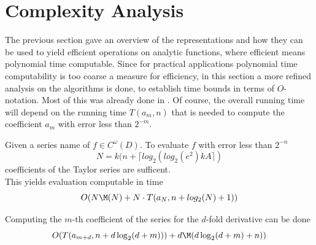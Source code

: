 	\section{Complexity Analysis}
		The previous section gave an overview of the representations and how they can be used to yield efficient 
		operations on analytic functions, where efficient means polynomial time computable.
		Since for practical applications polynomial time computability is too coarse a measure for efficiency, 
		in this section a more refined analysis on the algorithms is done, to establish time bounds in terms of $O$-notation.
		Most of this was already done in \cite{mypaper}.
		Of course, the overall running time will depend on the running time $T(a_m, n)$ that is needed to 
		compute the coefficient $a_m$ with error less than $2^{-m}$.
		\begin{theorem}
			Given a series name of $f \in C^\omega(D)$.
			To evaluate $f$ with error less than $2^{-n}$ 
			$$N = k(n+\lceil log_2(log_2 (e^2) kA \rceil)$$
			coefficients of the Taylor series are sufficent. \\
			This yields evaluation computable in time 
			$$ O(N\M(N)+N \cdot T(a_N, n+log_2(N)+1)) $$ 
		\end{theorem}

		\begin{theorem}
			Computing the $m$-th coefficient of the series for the $d$-fold derivative can be done
			$$ O(T(a_{m+d}, n+d\log_2(d+m)))+d\M(d \log_2 (d+m)+n)) $$
		\end{theorem}

